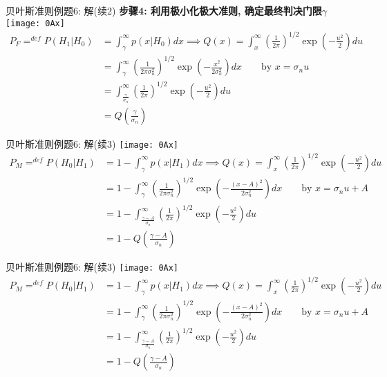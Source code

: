 \begin{frame}[shrink]{贝叶斯准则例题6: 解(续2)}
\textbf{步骤4: 利用极小化极大准则, 确定最终判决门限$\gamma$}
\texttt{[image: 0Ax]}
\begin{align*}
P_F\mathop{=}^{def}P(H_1|H_0)&=\int_{\gamma}^{\infty}p(x|H_0)dx\implies Q(x)=\int_{x}^{\infty}\left(\frac{1}{2\pi}\right)^{1/2}\exp\left(-\frac{u^2}{2}\right)du\\
&=\int_{\gamma}^{\infty}\left(\frac{1}{2\pi\sigma_n^2}\right)^{1/2}\exp\left(-\frac{x^2}{2\sigma_n^2}\right)dx\qquad \text{by } x=\sigma_nu\\
&=\int_{\frac{\gamma}{\sigma_n}}^{\infty}\left(\frac{1}{2\pi}\right)^{1/2}\exp\left(-\frac{u^2}{2}\right)du\\
&=Q\left(\frac{\gamma}{\sigma_n}\right)
\end{align*}
\end{frame}

\begin{frame}[shrink]{贝叶斯准则例题6: 解(续3)}
\texttt{[image: 0Ax]}
\begin{align*}
P_M\mathop{=}^{def}P(H_0|H_1)&=1-\int_{\gamma}^{\infty}p(x|H_1)dx\implies Q(x)=\int_{x}^{\infty}\left(\frac{1}{2\pi}\right)^{1/2}\exp\left(-\frac{u^2}{2}\right)du\\
&=1-\int_{\gamma}^{\infty}\left(\frac{1}{2\pi\sigma_n^2}\right)^{1/2}\exp\left(-\frac{(x-A)^2}{2\sigma_n^2}\right)dx\qquad \text{by } x=\sigma_nu+A\\
&=1-\int_{\frac{\gamma-A}{\sigma_n}}^{\infty}\left(\frac{1}{2\pi}\right)^{1/2}\exp\left(-\frac{u^2}{2}\right)du\\
&=1-Q\left(\frac{\gamma-A}{\sigma_n}\right)
\end{align*}
\end{frame}

\begin{frame}[shrink]{贝叶斯准则例题6: 解(续3)}
\texttt{[image: 0Ax]}
\begin{align*}
P_M\mathop{=}^{def}P(H_0|H_1)&=1-\int_{\gamma}^{\infty}p(x|H_1)dx\implies Q(x)=\int_{x}^{\infty}\left(\frac{1}{2\pi}\right)^{1/2}\exp\left(-\frac{u^2}{2}\right)du\\
&=1-\int_{\gamma}^{\infty}\left(\frac{1}{2\pi\sigma_n^2}\right)^{1/2}\exp\left(-\frac{(x-A)^2}{2\sigma_n^2}\right)dx\qquad \text{by } x=\sigma_nu+A\\
&=1-\int_{\frac{\gamma-A}{\sigma_n}}^{\infty}\left(\frac{1}{2\pi}\right)^{1/2}\exp\left(-\frac{u^2}{2}\right)du\\
&=1-Q\left(\frac{\gamma-A}{\sigma_n}\right)
\end{align*}
\end{frame}

